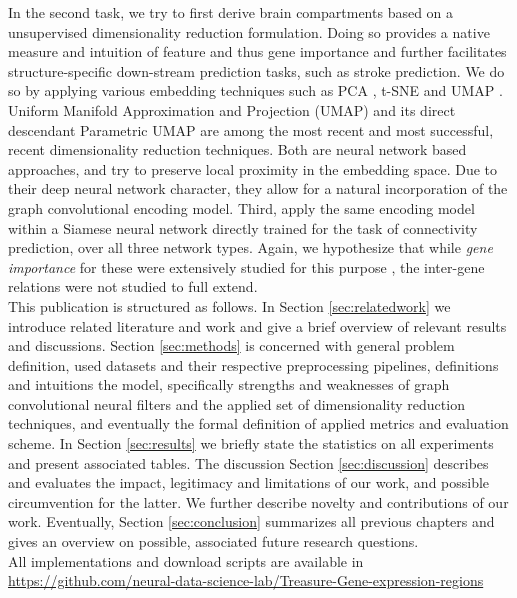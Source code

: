 \documentclass[]{article}
\renewcommand{\cite}{\citep}
\newcommand{\Github}{https://github.com/neural-data-science-lab/Treasure-Gene-expression-regions}
\begin{document}
In the second task, we try to first derive brain compartments based on a unsupervised dimensionality reduction formulation. Doing so provides a native measure and intuition of feature and thus gene importance and further facilitates structure-specific down-stream prediction tasks, such as stroke prediction.
We do so by applying various embedding techniques such as PCA \cite{wold1987principal}, t-SNE \cite{van2008visualizing} and UMAP  \cite{mcinnes2018umap}. Uniform Manifold Approximation and Projection (UMAP) and its direct descendant Parametric UMAP \cite{sainburg2021parametric} are among the most recent and most successful, recent dimensionality reduction techniques. Both are neural network based approaches, and try to preserve local proximity in the embedding space. Due to their deep neural network character, they allow for a natural incorporation of the graph convolutional encoding model. 
Third, apply the same encoding model within a Siamese neural network directly trained for the task of connectivity prediction, over all three network types. Again, we hypothesize that while \textit{gene importance} for these were extensively studied for this purpose \cite{bohland2010clustering, ValkShapingBrainStructure2020, takata_flexible_2021, friston2011functional}, the inter-gene relations were not studied to full extend.\\

This publication is structured as follows. In Section \ref{sec:relatedwork} we introduce related literature and work and give a brief overview of relevant results and discussions. Section \ref{sec:methods} is concerned with general problem definition, used datasets and their respective preprocessing pipelines, definitions and intuitions the model, specifically strengths and weaknesses of graph convolutional neural filters and the applied set of dimensionality reduction techniques, and eventually the formal definition of applied metrics and evaluation scheme.
In Section \ref{sec:results} we briefly state the statistics on all experiments and present associated tables. The discussion Section \ref{sec:discussion} describes and evaluates the impact, legitimacy and limitations of our work, and possible circumvention for the latter. We further describe novelty and contributions of our work. Eventually, Section \ref{sec:conclusion} summarizes all previous chapters and gives an overview on possible, associated future research questions.\\

All implementations and download scripts are available in \href{\Github}{\Github}
\end{document}
